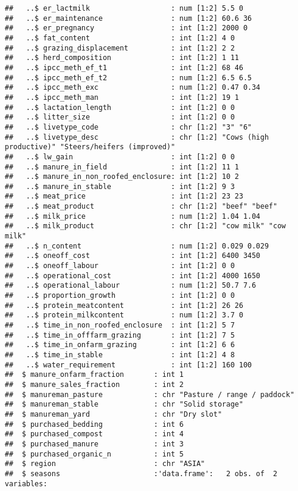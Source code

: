 \documentclass[
]{article}
\begin{document}
\begin{verbatim}
##   ..$ er_lactmilk                   : num [1:2] 5.5 0
##   ..$ er_maintenance                : num [1:2] 60.6 36
##   ..$ er_pregnancy                  : int [1:2] 2000 0
##   ..$ fat_content                   : int [1:2] 4 0
##   ..$ grazing_displacement          : int [1:2] 2 2
##   ..$ herd_composition              : int [1:2] 1 11
##   ..$ ipcc_meth_ef_t1               : int [1:2] 68 46
##   ..$ ipcc_meth_ef_t2               : num [1:2] 6.5 6.5
##   ..$ ipcc_meth_exc                 : num [1:2] 0.47 0.34
##   ..$ ipcc_meth_man                 : int [1:2] 19 1
##   ..$ lactation_length              : int [1:2] 0 0
##   ..$ litter_size                   : int [1:2] 0 0
##   ..$ livetype_code                 : chr [1:2] "3" "6"
##   ..$ livetype_desc                 : chr [1:2] "Cows (high productive)" "Steers/heifers (improved)"
##   ..$ lw_gain                       : int [1:2] 0 0
##   ..$ manure_in_field               : int [1:2] 11 1
##   ..$ manure_in_non_roofed_enclosure: int [1:2] 10 2
##   ..$ manure_in_stable              : int [1:2] 9 3
##   ..$ meat_price                    : int [1:2] 23 23
##   ..$ meat_product                  : chr [1:2] "beef" "beef"
##   ..$ milk_price                    : num [1:2] 1.04 1.04
##   ..$ milk_product                  : chr [1:2] "cow milk" "cow milk"
##   ..$ n_content                     : num [1:2] 0.029 0.029
##   ..$ oneoff_cost                   : int [1:2] 6400 3450
##   ..$ oneoff_labour                 : int [1:2] 0 0
##   ..$ operational_cost              : int [1:2] 4000 1650
##   ..$ operational_labour            : num [1:2] 50.7 7.6
##   ..$ proportion_growth             : int [1:2] 0 0
##   ..$ protein_meatcontent           : int [1:2] 26 26
##   ..$ protein_milkcontent           : num [1:2] 3.7 0
##   ..$ time_in_non_roofed_enclosure  : int [1:2] 5 7
##   ..$ time_in_offfarm_grazing       : int [1:2] 7 5
##   ..$ time_in_onfarm_grazing        : int [1:2] 6 6
##   ..$ time_in_stable                : int [1:2] 4 8
##   ..$ water_requirement             : int [1:2] 160 100
##  $ manure_onfarm_fraction       : int 1
##  $ manure_sales_fraction        : int 2
##  $ manureman_pasture            : chr "Pasture / range / paddock"
##  $ manureman_stable             : chr "Solid storage"
##  $ manureman_yard               : chr "Dry slot"
##  $ purchased_bedding            : int 6
##  $ purchased_compost            : int 4
##  $ purchased_manure             : int 3
##  $ purchased_organic_n          : int 5
##  $ region                       : chr "ASIA"
##  $ seasons                      :'data.frame':   2 obs. of  2 variables:

\end{verbatim}
\end{document}
